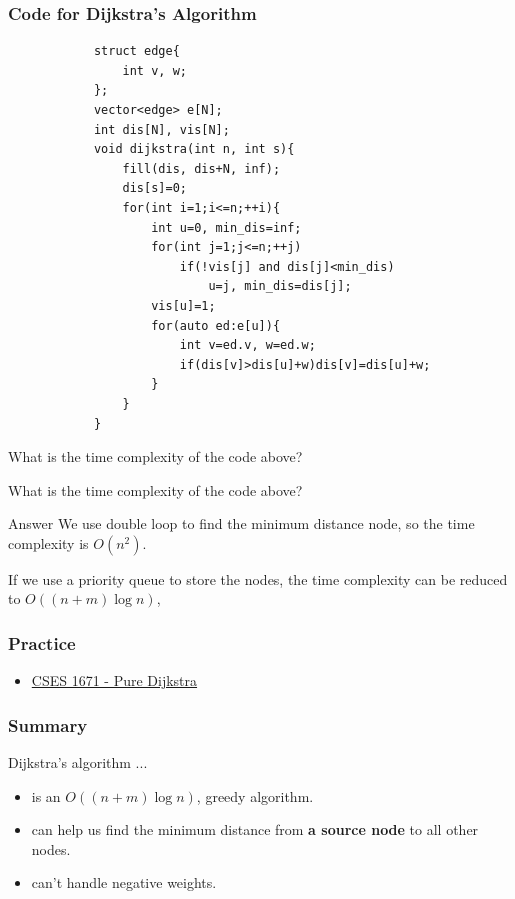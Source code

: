 \documentclass[xcolor=dvipsnames]{beamer}
\begin{document}
    \scriptsize
    \begin{frame}[fragile]
        \frametitle{Code for Dijkstra's Algorithm}
        \begin{verbatim}
            struct edge{
                int v, w;
            };
            vector<edge> e[N];
            int dis[N], vis[N];
            void dijkstra(int n, int s){
                fill(dis, dis+N, inf);
                dis[s]=0;
                for(int i=1;i<=n;++i){
                    int u=0, min_dis=inf;
                    for(int j=1;j<=n;++j)
                        if(!vis[j] and dis[j]<min_dis)
                            u=j, min_dis=dis[j];
                    vis[u]=1;
                    for(auto ed:e[u]){
                        int v=ed.v, w=ed.w;
                        if(dis[v]>dis[u]+w)dis[v]=dis[u]+w;
                    }
                }
            }
        \end{verbatim}
    \end{frame}
    \begin{frame}
        What is the time complexity of the code above?

    \end{frame}
    \begin{frame}
        What is the time complexity of the code above?
        \begin{block}{Answer}
            We use double loop to find the minimum distance node,
            so the time complexity is $O(n^2)$.
        \end{block}
        If we use a priority queue to store the nodes,
        the time complexity can be reduced to $O((n+m)\log n)$,
    \end{frame}
    \begin{frame}
        \frametitle{Practice}
        \begin{itemize}
            \item \href{https://cses.fi/problemset/task/1671}{CSES 1671 - Pure Dijkstra}
        \end{itemize}
    \end{frame}
    \begin{frame}
        \frametitle{Summary}
        Dijkstra's algorithm ...
        \begin{itemize}
            \item is an $O((n+m)\log n)$, greedy algorithm.
            \item can help us find the minimum distance from \textbf{a source node} to all other nodes.
            \item can't handle negative weights.
        \end{itemize}
    \end{frame}
\end{document}
